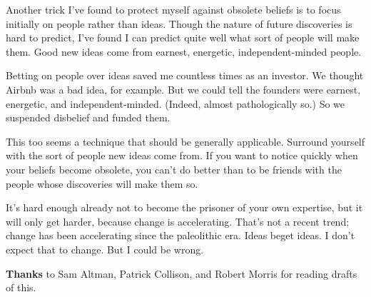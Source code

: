 Another trick I've found to protect myself against obsolete beliefs is
to focus initially on people rather than ideas. Though the nature of
future discoveries is hard to predict, I've found I can predict quite
well what sort of people will make them. Good new ideas come from
earnest, energetic, independent-minded people.

Betting on people over ideas saved me countless times as an investor. We
thought Airbnb was a bad idea, for example. But we could tell the
founders were earnest, energetic, and independent-minded. (Indeed,
almost pathologically so.) So we suspended disbelief and funded them.

This too seems a technique that should be generally applicable. Surround
yourself with the sort of people new ideas come from. If you want to
notice quickly when your beliefs become obsolete, you can't do better
than to be friends with the people whose discoveries will make them so.

It's hard enough already not to become the prisoner of your own
expertise, but it will only get harder, because change is accelerating.
That's not a recent trend; change has been accelerating since the
paleolithic era. Ideas beget ideas. I don't expect that to change. But I
could be wrong.


\textbf{Thanks} to Sam Altman, Patrick Collison, and Robert Morris for
reading drafts of this.